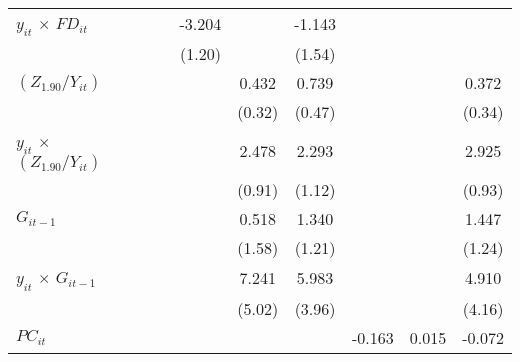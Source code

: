\documentclass[12pt, a4paper]{article}
\begin{document}
\begin{appendices}
\begin{table}[htbp]
\begin{threeparttable}
{\begin{tabular}{l*{9}{c}}
				$y_{it}$ $\times$ $FD_{it}$ &                     &                     &                     &      -3.204\sym{**} &                     &      -1.143         &                     &                     &                     \\
				&                     &                     &                     &      (1.20)         &                     &      (1.54)         &                     &                     &                     \\
				$(Z_{1.90}/Y_{it})$          &                     &                     &                     &                     &       0.432         &       0.739         &                     &                     &       0.372         \\
				&                     &                     &                     &                     &      (0.32)         &      (0.47)         &                     &                     &      (0.34)         \\
				$y_{it}$ $\times$ $(Z_{1.90}/Y_{it})$&                     &                     &                     &                     &       2.478\sym{**} &       2.293\sym{*}  &                     &                     &       2.925\sym{**} \\
				&                     &                     &                     &                     &      (0.91)         &      (1.12)         &                     &                     &      (0.93)         \\
				$G_{it-1}$           &                     &                     &                     &                     &       0.518         &       1.340         &                     &                     &       1.447         \\
				&                     &                     &                     &                     &      (1.58)         &      (1.21)         &                     &                     &      (1.24)         \\
				$y_{it}$ $\times$ $G_{it-1}$&                     &                     &                     &                     &       7.241         &       5.983         &                     &                     &       4.910         \\
				&                     &                     &                     &                     &      (5.02)         &      (3.96)         &                     &                     &      (4.16)         \\
				$PC_{it}$                &                     &                     &                     &                     &                     &                     &      -0.163         &       0.015         &      -0.072         \\

\end{tabular}}
\end{threeparttable}
\end{table}
\end{appendices}
\end{document}
